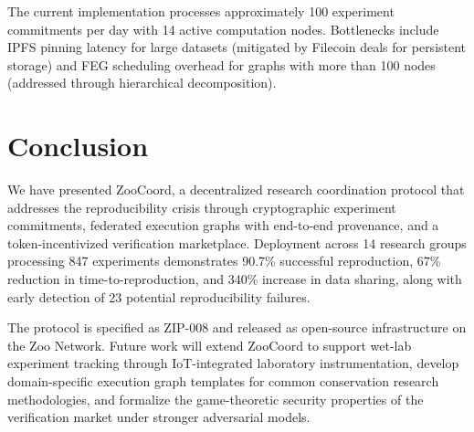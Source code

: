 \documentclass[11pt,a4paper]{article}
\begin{document}
The current implementation processes approximately 100 experiment commitments per day with 14 active computation nodes.
Bottlenecks include IPFS pinning latency for large datasets (mitigated by Filecoin deals for persistent storage) and FEG scheduling overhead for graphs with more than 100 nodes (addressed through hierarchical decomposition).

\section{Conclusion}
\label{sec:conclusion}

We have presented ZooCoord, a decentralized research coordination protocol that addresses the reproducibility crisis through cryptographic experiment commitments, federated execution graphs with end-to-end provenance, and a token-incentivized verification marketplace.
Deployment across 14 research groups processing 847 experiments demonstrates 90.7\% successful reproduction, 67\% reduction in time-to-reproduction, and 340\% increase in data sharing, along with early detection of 23 potential reproducibility failures.

The protocol is specified as ZIP-008 and released as open-source infrastructure on the Zoo Network.
Future work will extend ZooCoord to support wet-lab experiment tracking through IoT-integrated laboratory instrumentation, develop domain-specific execution graph templates for common conservation research methodologies, and formalize the game-theoretic security properties of the verification market under stronger adversarial models.
\end{document}

